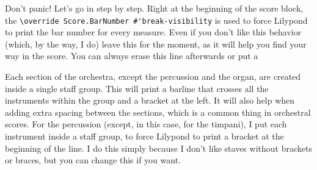 \documentclass[../../LilyPond-Tutorials]{subfiles}
\begin{document}

Don't panic!
Let's go in step by step.
Right at the beginning of the score block, the \verb|\override Score.BarNumber #'break-visibility| is used to force Lilypond to print the bar number for every measure.
Even if you don't like this behavior (which, by the way, I do) leave this for the moment, as it will help you find your way in the score.
You can always erase this line afterwards or put a %

Each section of the orchestra, except the percussion and the organ, are created inside a single staff group.
This will print a barline that crosses all the instruments within the group and a bracket at the left.
It will also help when adding extra spacing between the sections, which is a common thing in orchestral scores.
For the percussion (except, in this case, for the timpani), I put each instrument inside a staff group, to force Lilypond to print a bracket at the beginning of the line.
I do this simply because I don't like staves without brackets or braces, but you can change this if you want.
\end{document}
